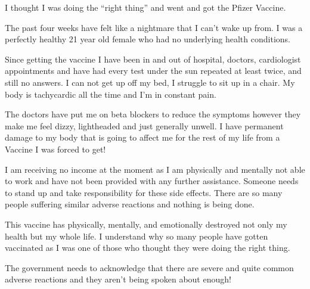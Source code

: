 I thought I was doing the “right thing” and went and got the Pfizer Vaccine.

The past four weeks have felt like a nightmare that I can’t wake up from. I was
a perfectly healthy 21 year old female who had no underlying health conditions.

Since getting the vaccine I have been in and out of hospital, doctors,
cardiologist appointments and have had every test under the sun repeated at
least twice, and still no answers. I can not get up off my bed, I struggle to
sit up in a chair. My body is tachycardic all the time and I’m in constant pain.

The doctors have put me on beta blockers to reduce the symptoms however they
make me feel dizzy, lightheaded and just generally unwell. I have permanent
damage to my body that is going to affect me for the rest of my life from a
Vaccine I was forced to get!

I am receiving no income at the moment as I am physically and mentally not able
to work and have not been provided with any further assistance. Someone needs to
stand up and take responsibility for these side effects. There are so many
people suffering similar adverse reactions and nothing is being done.

This vaccine has physically, mentally, and emotionally destroyed not only my
health but my whole life. I understand why so many people have gotten vaccinated
as I was one of those who thought they were doing the right thing.

The government needs to acknowledge that there are severe and quite common
adverse reactions and they aren’t being spoken about enough!
